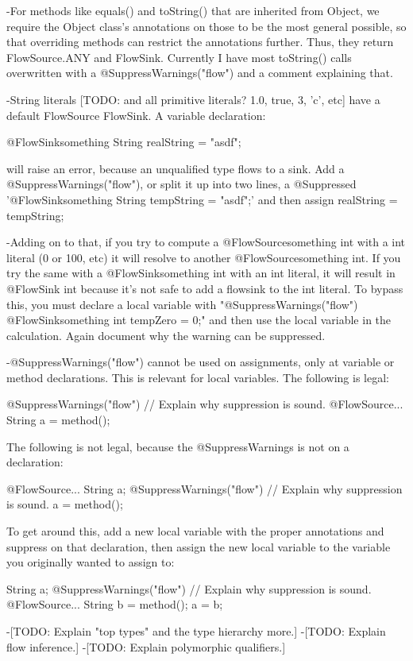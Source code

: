 -For methods like equals() and toString() that are inherited from
 Object, we require the Object class's annotations on those to be the
 most general possible, so that overriding methods can restrict the
 annotations further. Thus, they return FlowSource.ANY and
 FlowSink{}. Currently I have most toString() calls overwritten with a
 @SuppressWarnings("flow") and a comment explaining that. 

-String literals [TODO: and all primitive literals? 1.0, true, 3, 'c',
 etc] have a default FlowSource{} FlowSink{}. A variable declaration:

 @FlowSink{something} String realString = "asdf";

 will raise an error, because an unqualified type flows to a sink.
 Add a @SuppressWarnings("flow"), or split it up into two
 lines, a @Suppressed '@FlowSink{something} String tempString =
 "asdf";' and then assign realString = tempString;

-Adding on to that, if you try to compute a @FlowSource{something} int
 with a int literal (0 or 100, etc) it will resolve to another
 @FlowSource{something} int. If you try the same with a
 @FlowSink{something} int with an int literal, it will result in
 @FlowSink{} int because it's not safe to add a flowsink to the int
 literal. To bypass this, you must declare a local variable with
 "@SuppressWarnings("flow") \n @FlowSink{something} int tempZero = 0;"
 and then use the local variable in the calculation.
 Again document why the warning can be suppressed.

-@SuppressWarnings("flow") cannot be used on assignments, only at
 variable or method declarations. This is relevant for local
 variables.
 The following is legal:

	@SuppressWarnings("flow") // Explain why suppression is sound.
	@FlowSource... String a = method();

 The following is not legal, because the @SuppressWarnings is not on a
 declaration:

	@FlowSource... String a; 
	@SuppressWarnings("flow") // Explain why suppression is sound.
	a = method();

 To get around this, add a new local variable with the proper
 annotations and suppress on that declaration, then assign the new local
 variable to the variable you originally wanted to assign to:

	String a;
	@SuppressWarnings("flow") // Explain why suppression is sound.
	@FlowSource... String b = method();
	a = b;

-[TODO: Explain "top types" and the type hierarchy more.]
-[TODO: Explain flow inference.]
-[TODO: Explain polymorphic qualifiers.]
